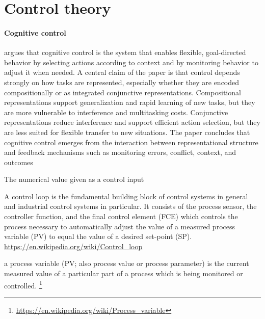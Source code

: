 \documentclass{book}
\providecommand{\seeherefooter}[1]{\footnote{\url{#1}}}
\begin{document}
\section{Control theory}


\paragraph{Cognitive control}
        \cite{badre-2025-cognitive-control} argues that cognitive control is the system that enables flexible, goal-directed behavior by selecting actions according to context and by monitoring behavior to adjust it when needed. A central claim of the paper is that control depends strongly on how tasks are represented, especially whether they are encoded compositionally or as integrated conjunctive representations. Compositional representations support generalization and rapid learning of new tasks, but they are more vulnerable to interference and multitasking costs. Conjunctive representations reduce interference and support efficient action selection, but they are less suited for flexible transfer to new situations. The paper concludes that cognitive control emerges from the interaction between representational structure and feedback mechanisms such as monitoring errors, conflict, context, and outcomes


%


The numerical value given as a control input


A control loop is the fundamental building block of control systems in general and industrial control systems in particular. It consists of the process sensor, the controller function, and the final control element (FCE) which controls the process necessary to automatically adjust the value of a measured process variable (PV) to equal the value of a desired set-point (SP).
    \url{https://en.wikipedia.org/wiki/Control_loop}


a process variable (PV; also process value or process parameter) is the current measured value of a particular part of a process which is being monitored or controlled. \seeherefooter{https://en.wikipedia.org/wiki/Process_variable}
\end{document}
